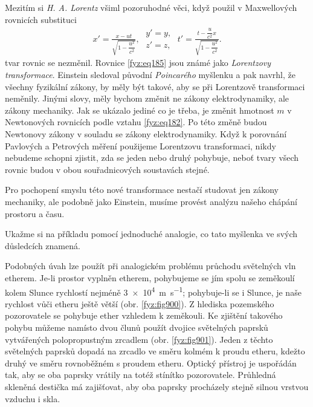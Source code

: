     Mezitím si \emph{H. A. Lorentz} všiml pozoruhodné věci, když použil v Maxwellových rovnicích
    substituci
    \begin{gather}\label{fyz:eq185}
      x' = \frac{x - ut}{\sqrt{1-\dfrac{u^2}{c^2}}}, \;
      \begin{array}{c}      
        y' = y, \\ z' = z,                         
      \end{array}\;
      t' = \frac{t-\dfrac{u}{c^2}x}{\sqrt{1-\dfrac{u^2}{c^2}}}. 
    \end{gather} 
    tvar rovnic se nezměnil. Rovnice \ref{fyz:eq185} jsou známé jako \emph{Lorentzovy 
    transformace}. Einstein sledoval původní \emph{Poincarého} myšlenku a pak navrhl, že všechny 
    fyzikální zákony, by měly být takové, aby se při Lorentzově transformaci neměnily. Jinými 
    slovy, měly bychom změnit ne zákony elektrodynamiky, ale zákony mechaniky. Jak se ukázalo 
    jediné co je třeba, je změnit hmotnost \(m\) v Newtonových rovnicích podle vztahu 
    \ref{fyz:eq182}. Po této změně budou Newtonovy zákony v souladu se zákony elektrodynamiky. Když 
    k porovnání Pavlových a Petrových měření použijeme Lorentzovu transformaci, nikdy nebudeme 
    schopni zjistit, zda se jeden nebo druhý pohybuje, neboť tvary všech rovnic budou v obou 
    souřadnicových soustavách stejné. 
    
    Pro pochopení smyslu této nové transformace nestačí studovat jen zákony mechaniky, ale podobně 
    jako Einstein, musíme provést analýzu našeho chápání prostoru a času. 

    Ukažme si na příkladu pomocí jednoduché analogie, co tato myšlenka ve svých důsledcích znamená.
    

    Podobných úvah lze použít při analogickém problému průchodu světelných vln etherem. Je-li
    prostor vyplněn etherem, pohybujeme se jím spolu se zeměkoulí kolem Slunce rychlostí nejméně
    \SI{3e4}{\metre\per\second}; pohybuje-li se i Slunce, je naše rychlost vůči etheru ještě větší
    (obr. \ref{fyz:fig900}). Z hlediska pozemského pozorovatele se pohybuje ether vzhledem k
    zeměkouli. Ke zjištění takového pohybu můžeme namísto dvou člunů použít dvojice světelných
    paprsků vytvářených polopropustným zrcadlem (obr. \ref{fyz:fig901}). Jeden z těchto světelných
    paprsků dopadá na zrcadlo ve směru kolmém k proudu etheru, kdežto druhý ve směru rovnoběžném s
    proudem etheru. Optický přístroj je uspořádán tak, aby se oba paprsky vrátily na totéž stínítko
    pozorovatele. Průhledná skleněná destička má zajišťovat, aby oba paprsky procházely stejně
    silnou vrstvou vzduchu i skla.

